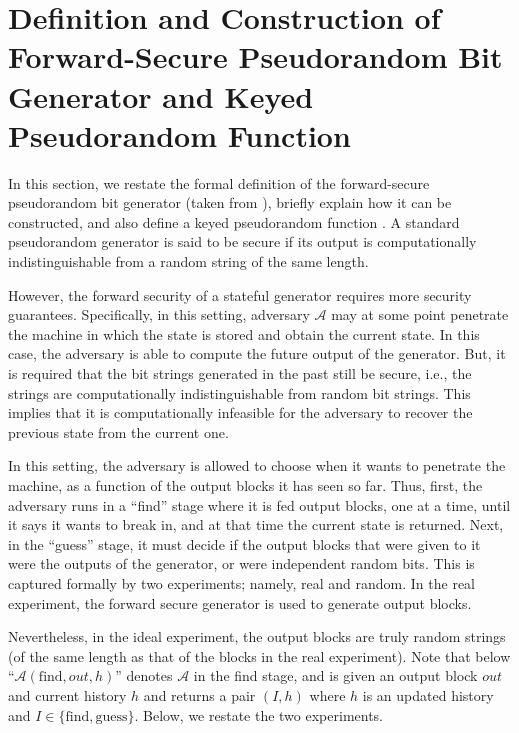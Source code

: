 

\section{Definition and Construction of Forward-Secure Pseudorandom Bit Generator and Keyed Pseudorandom Function}\label{app:def-FS-PRG}

In this section, we restate the formal definition of the forward-secure pseudorandom bit generator (taken from \cite{BellareY03}), briefly explain how it can be constructed, and also define a keyed pseudorandom function \prf. A standard pseudorandom generator is said to be secure if its output is computationally indistinguishable from a random string of the same length. 

However, the forward security of a stateful generator requires more security guarantees. Specifically, in this setting,  adversary $\mathcal{A}$ may at some point penetrate the machine in which the state is stored and obtain the current state. In this case, the adversary is able to compute the future output of the generator. But, it is required that the bit strings generated in the past still be secure, i.e., the strings are computationally indistinguishable from random bit strings. This implies that it is computationally infeasible for the adversary to recover the previous state from the current one. 





In this setting, the adversary is allowed to choose when it wants to penetrate the machine, as a function of the output blocks it has seen so far. Thus, first, the adversary runs in a ``find'' stage where it is fed output blocks, one at a time, until it says it wants to break in, and at that time the current state is returned.  Next, in the ``guess'' stage, it must decide if the output blocks that were given to it were the outputs of the generator, or were independent random bits. This is captured formally by two experiments; namely, real and random. In the real experiment, the forward secure generator is used to generate output blocks. 

Nevertheless, in the ideal experiment, the output blocks are truly random strings (of the same length as that of the blocks in the real experiment). Note that below ``$\mathcal{A}(\text{find}, out, h)$'' denotes $\mathcal{A}$ in the find stage, and is given an output block $out$ and current history $h$ and returns a pair $(I, h)$ where $h$ is an updated history and $I \in\{\text{find}, \text{guess}\}$. Below, we restate the two experiments. 






